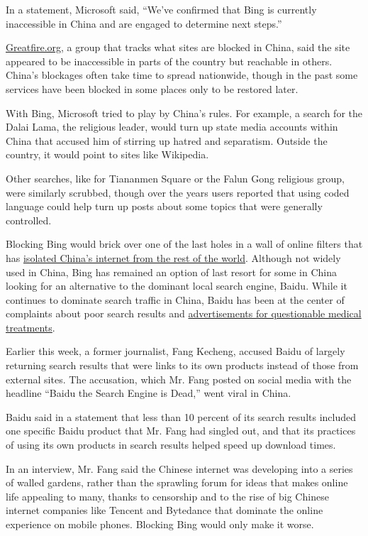In a statement, Microsoft said, ``We've confirmed that Bing is currently
inaccessible in China and are engaged to determine next steps.''

\href{http://greatfire.org/}{Greatfire.org}, a group that tracks what
sites are blocked in China, said the site appeared to be inaccessible in
parts of the country but reachable in others. China's blockages often
take time to spread nationwide, though in the past some services have
been blocked in some places only to be restored later.

With Bing, Microsoft tried to play by China's rules. For example, a
search for the Dalai Lama, the religious leader, would turn up state
media accounts within China that accused him of stirring up hatred and
separatism. Outside the country, it would point to sites like Wikipedia.

Other searches, like for Tiananmen Square or the Falun Gong religious
group, were similarly scrubbed, though over the years users reported
that using coded language could help turn up posts about some topics
that were generally controlled.

Blocking Bing would brick over one of the last holes in a wall of online
filters that has
\href{https://www.nytimes3xbfgragh.onion/2018/08/06/technology/china-generation-blocked-internet.html}{isolated
China's internet from the rest of the world}. Although not widely used
in China, Bing has remained an option of last resort for some in China
looking for an alternative to the dominant local search engine, Baidu.
While it continues to dominate search traffic in China, Baidu has been
at the center of complaints about poor search results and
\href{https://www.nytimes3xbfgragh.onion/2016/05/04/world/asia/china-baidu-investigation-student-cancer.html}{advertisements
for questionable medical treatments}.

Earlier this week, a former journalist, Fang Kecheng, accused Baidu of
largely returning search results that were links to its own products
instead of those from external sites. The accusation, which Mr. Fang
posted on social media with the headline ``Baidu the Search Engine is
Dead,'' went viral in China.

Baidu said in a statement that less than 10 percent of its search
results included one specific Baidu product that Mr. Fang had singled
out, and that its practices of using its own products in search results
helped speed up download times.

In an interview, Mr. Fang said the Chinese internet was developing into
a series of walled gardens, rather than the sprawling forum for ideas
that makes online life appealing to many, thanks to censorship and to
the rise of big Chinese internet companies like Tencent and Bytedance
that dominate the online experience on mobile phones. Blocking Bing
would only make it worse.

